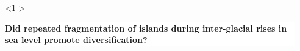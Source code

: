 {
\begin{frame}
    \begin{columns}

        \vspace{6.5cm}

        \ \\


        \vspace{-2cm}

        \begin{uncoverenv}<1->
        \colorbox{white}{
            \begin{minipage}[t]{1.0\textwidth}
                \raggedright
                \textbf{Did repeated fragmentation of islands during
                    inter-glacial rises in sea level promote diversification?}
            \end{minipage}
        }
        \end{uncoverenv}
    \end{columns}
\end{frame}
}

